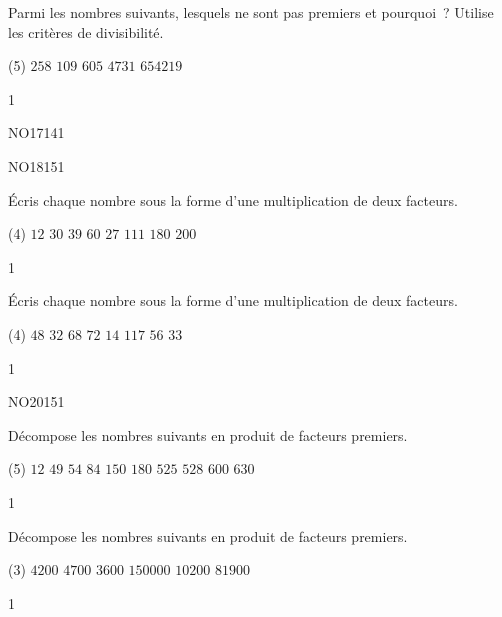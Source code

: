 \documentclass[a4paper,11pt]{report}
\begin{document}
\begin{exo}{ %
    Parmi les nombres suivants, lesquels ne sont pas premiers et pourquoi~? Utilise les critères de divisibilité.
    \begin{tasks}(5)
    \task $258$
    \task $109$
    \task $605$
    \task $4731$
    \task $654219$
\end{tasks}
}{1}\end{exo}

\begin{exol}{NO17}{14}{1}
\end{exol}

\begin{exol}{NO18}{15}{1}
\end{exol}

\begin{exo}{ %
    Écris chaque nombre sous la forme d'une multiplication de deux facteurs.
    \begin{tasks}(4)
    \task $12$
    \task $30$
    \task $39$
    \task $60$
    \task $27$
    \task $111$
    \task $180$
    \task $200$
\end{tasks}
}{1}\end{exo}

\begin{exo}{ %
    Écris chaque nombre sous la forme d'une multiplication de deux facteurs.
    \begin{tasks}(4)
    \task $48$
    \task $32$
    \task $68$
    \task $72$
    \task $14$
    \task $117$
    \task $56$
    \task $33$
\end{tasks}
}{1}\end{exo}




\begin{exol}{NO20}{15}{1}
\end{exol}



\begin{exo}{
    Décompose les nombres suivants en produit de facteurs premiers.
    \begin{tasks}(5)
    \task $12$
    \task $49$
    \task $54$
    \task $84$
    \task $150$
    \task $180$
    \task $525$
    \task $528$
    \task $600$
    \task $630$
    \end{tasks}
}{1}\end{exo}



\begin{exo}{ %
    Décompose les nombres suivants en produit de facteurs premiers.
    \begin{tasks}(3)
    \task $4200$
    \task $4700$
    \task $3600$
    \task $150000$
    \task $10200$
    \task $81900$
    \end{tasks}
}{1}\end{exo}
\end{document}
